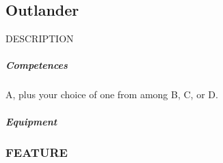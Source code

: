 \subsection*{Outlander} \label{ssec::outlander}
    DESCRIPTION
    \subparagraph{Competences} A, plus your choice of one from among B, C, or D.
    \subparagraph{Equipment}
    \subsubsection{FEATURE}


